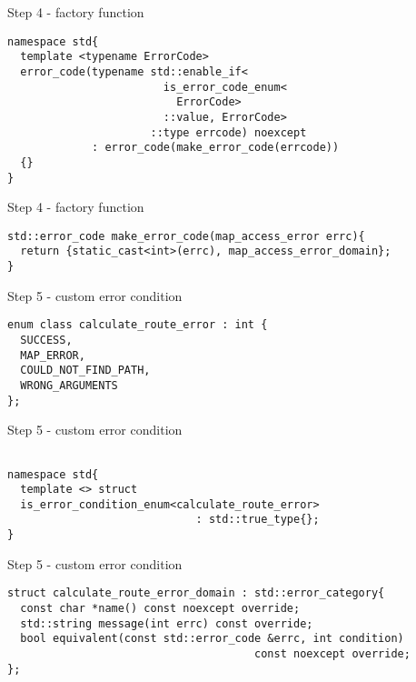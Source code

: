 \documentclass[10pt]{beamer}
\begin{document}
\begin{frame}[fragile]{Step 4 - factory function}

	\begin{verbatim}
namespace std{
  template <typename ErrorCode>
  error_code(typename std::enable_if<
                        is_error_code_enum<
                          ErrorCode>
                        ::value, ErrorCode>
                      ::type errcode) noexcept 
             : error_code(make_error_code(errcode))
  {}
}
	\end{verbatim}
	
\end{frame}

\begin{frame}[fragile]{Step 4 - factory function}
	\begin{verbatim}
std::error_code make_error_code(map_access_error errc){
  return {static_cast<int>(errc), map_access_error_domain};
}
	\end{verbatim}
\end{frame}

\begin{frame}[fragile]{Step 5 - custom error condition}
	\begin{verbatim}
enum class calculate_route_error : int {
  SUCCESS,
  MAP_ERROR,
  COULD_NOT_FIND_PATH,
  WRONG_ARGUMENTS
};
	\end{verbatim}
\end{frame}

\begin{frame}[fragile]{Step 5 - custom error condition}
	\begin{verbatim}

namespace std{
  template <> struct
  is_error_condition_enum<calculate_route_error>
                             : std::true_type{};
}
	\end{verbatim}
\end{frame}

\begin{frame}[fragile]{Step 5 - custom error condition}
	\begin{verbatim}
struct calculate_route_error_domain : std::error_category{
  const char *name() const noexcept override;
  std::string message(int errc) const override;
  bool equivalent(const std::error_code &errc, int condition) 
                                      const noexcept override;
};
	\end{verbatim}
\end{frame}
\end{document}
